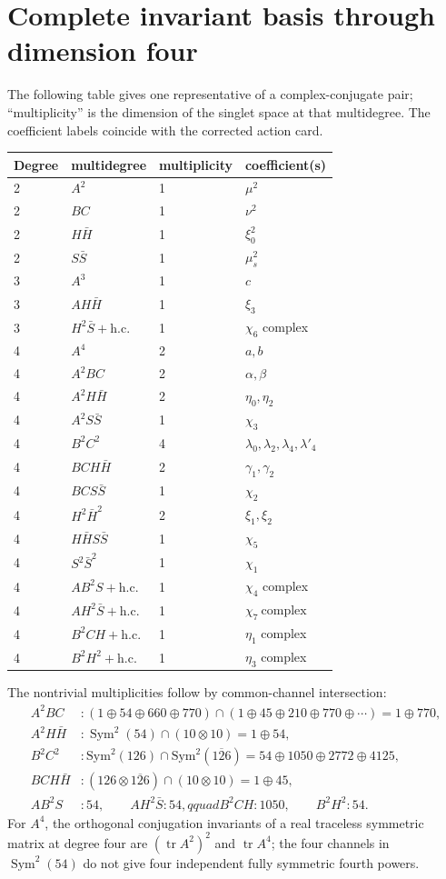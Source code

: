 \documentclass[11pt]{article}
\newcommand{\Sym}{\operatorname{Sym}}
\newcommand{\hc}{\mathrm{h.c.}}
\begin{document}
\section{Complete invariant basis through dimension four}

The following table gives one representative of a complex-conjugate pair;
``multiplicity'' is the dimension of the singlet space at that multidegree.
The coefficient labels coincide with the corrected action card.
\begin{longtable}{@{}llll@{}}
\toprule
Degree & multidegree & multiplicity & coefficient(s)\\
\midrule
\endhead
2&$A^2$&1&$\mu^2$\\
2&$BC$&1&$\nu^2$\\
2&$H\bar H$&1&$\xi_0^2$\\
2&$S\bar S$&1&$\mu_s^2$\\
\midrule
3&$A^3$&1&$c$\\
3&$AH\bar H$&1&$\xi_3$\\
3&$H^2\bar S+\hc$&1&$\chi_6$ complex\\
\midrule
4&$A^4$&2&$a,b$\\
4&$A^2BC$&2&$\alpha,\beta$\\
4&$A^2H\bar H$&2&$\eta_0,\eta_2$\\
4&$A^2S\bar S$&1&$\chi_3$\\
4&$B^2C^2$&4&$\lambda_0,\lambda_2,\lambda_4,\lambda'_4$\\
4&$BCH\bar H$&2&$\gamma_1,\gamma_2$\\
4&$BCS\bar S$&1&$\chi_2$\\
4&$H^2\bar H^2$&2&$\xi_1,\xi_2$\\
4&$H\bar HS\bar S$&1&$\chi_5$\\
4&$S^2\bar S^2$&1&$\chi_1$\\
4&$AB^2S+\hc$&1&$\chi_4$ complex\\
4&$AH^2\bar S+\hc$&1&$\boxed{\chi_7\ \text{complex}}$\\
4&$B^2CH+\hc$&1&$\eta_1$ complex\\
4&$B^2H^2+\hc$&1&$\eta_3$ complex\\
\bottomrule
\end{longtable}

The nontrivial multiplicities follow by common-channel intersection:
\begin{align}
 A^2BC &: (1\oplus54\oplus660\oplus770)
 \cap(1\oplus45\oplus210\oplus770\oplus\cdots)=1\oplus770,\nonumber\\
 A^2H\bar H &: \Sym^2(54)\cap(10\otimes10)=1\oplus54,\nonumber\\
 B^2C^2 &: \mathrm{Sym}^2(126)\cap\mathrm{Sym}^2(\overline{126})
 =54\oplus1050\oplus2772\oplus4125,\nonumber\\
 BCH\bar H &: (126\otimes\overline{126})\cap(10\otimes10)=1\oplus45,
 \label{eq:intersections}\\
 AB^2S &: 54,\qquad AH^2\bar S:54,qquad
 B^2CH:1050,\qquad B^2H^2:54.\nonumber
\end{align}
For $A^4$, the orthogonal conjugation invariants of a real traceless
symmetric matrix at degree four are
$(\operatorname{tr}A^2)^2$ and $\operatorname{tr}A^4$; the four channels in
$\Sym^2(54)$ do not give four independent fully symmetric fourth powers.
\end{document}

